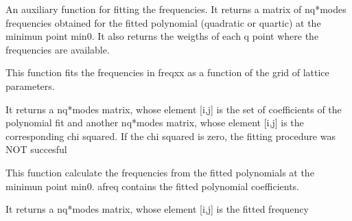 \documentclass[letterpaper,10pt,english]{sphinxmanual}
\begin{document}
\begin{fulllineitems}
\label{pyqha:pyqha.fitfreqgrun.fitfreq}
An auxiliary function for fitting the frequencies. It returns a matrix of nq*modes
frequencies obtained for the fitted polynomial (quadratic or quartic) at the 
minimun point min0. It also returns the weigths of each q point where the 
frequencies are available.

\end{fulllineitems}


\begin{fulllineitems}
\label{pyqha:pyqha.fitfreqgrun.fitfreqxx}
This function fits the frequencies in freqxx as a function of the
grid of lattice parameters.

It returns a nq*modes matrix, whose element {[}i,j{]} is the set of coefficients of the 
polynomial fit and another nq*modes matrix, whose element {[}i,j{]} is the corresponding
chi squared. If the chi squared is zero, the fitting procedure was NOT succesful

\end{fulllineitems}


\begin{fulllineitems}
\label{pyqha:pyqha.fitfreqgrun.freqmin}
This function calculate the frequencies from the fitted polynomials at the 
minimun point min0. afreq contains the fitted polynomial coefficients.

It returns a nq*modes matrix, whose element {[}i,j{]} is the fitted frequency

\end{fulllineitems}

\end{document}

